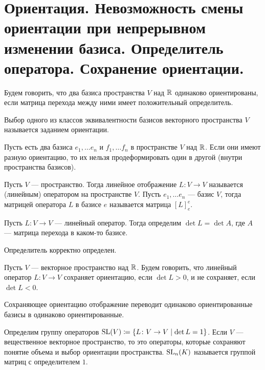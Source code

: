 % 
% 
\section{Ориентация. Невозможность смены ориентации при непрерывном изменении базиса. Определитель оператора. Сохранение ориентации.}
\begin{defn}
    Будем говорить, что два базиса пространства $ V$ над  $ \mathbb{R}$  {\sf одинаково ориентированы}, если матрица перехода между ними имеет положительный определитель. 
\end{defn}
\begin{defn}
    Выбор одного из классов эквивалентности базисов векторного пространства $ V$ называется  {\sf заданием ориентации}.
\end{defn}
\begin{st}
    Пусть есть два базиса $ e_1, \ldots e_n$ и $ f_1, \ldots f_n$ в пространстве $ V$ над  $ \mathbb{R}$. Если они имеют разную ориентацию, то их нельзя продеформировать один в другой (внутри пространства базисов).
\end{st}
\begin{defn}
    Пусть  $ V$ --- пространство. Тогда линейное отображение $ L\colon  V \to  V$ называется {\sf (линейным) оператором} на пространстве $ V$. Пусть $ e_1, \ldots e_n$ --- базис $ V$, тогда  {\sf матрицей оператора $ L$} в базисе $ e$ называется матрица  $ [L]_e^{e}$.    
\end{defn}
\begin{defn}
    Пусть $ L\colon V \to  V$ --- линейный оператор. Тогда определим $ \det L = \det A$, где $ A$ --- матрица перехода в каком-то базисе.
    \begin{note}
        Определитель корректно определен.
    \end{note}
\end{defn}
\begin{defn}
    Пусть $ V$ ---  векторное пространство над $ \mathbb{R}$. Будем говорить, что линейный оператор  $ L\colon V \to  V$ {\sf сохраняет ориентацию}, если $ \det L >0$, и {\sf не сохраняет}, если $ \det L <0$.  
\end{defn}
\begin{lm}
    Сохраняющее ориентацию отображение переводит одинаково ориентированные базисы в одинаково ориентированные.
\end{lm}
\begin{defn}
    Определим группу операторов $ \operatorname{SL}(V) \coloneqq \{L\colon V \to  V \mid \det L = 1\}$. Если $ V$ --- вещественное  векторное пространство, то это операторы, которые сохраняют понятие объема и выбор ориентации пространства. $ \operatorname{SL}_n(K)$ называется  {\sf группой матриц с определителем $1$}.  
\end{defn}
% 
